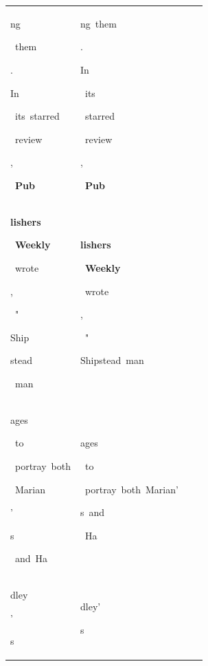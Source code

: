 \begin{table}[h]
\begin{tabular}{ l l l l }
 \colorbox{cm_31!40}{\strut ng}\colorbox{cm_29!40}{\strut \ them}\colorbox{cm_31!40}{\strut .}\colorbox{cm_29!40}{\strut }\colorbox{cm_31!40}{\strut }\colorbox{cm_25!40}{\strut In}\colorbox{cm_63!40}{\strut \ its\ starred}\colorbox{cm_32!40}{\strut \ review}\colorbox{cm_24!40}{\strut ,}\colorbox{cm_63!40}{\strut \ \textbf{Pub}} & \colorbox{cm_0!40}{\strut ng\ them}\colorbox{cm_12!40}{\strut .}\colorbox{cm_25!40}{\strut }\colorbox{cm_38!40}{\strut }\colorbox{cm_0!40}{\strut In}\colorbox{cm_12!40}{\strut \ its}\colorbox{cm_0!40}{\strut \ starred}\colorbox{cm_12!40}{\strut \ review}\colorbox{cm_25!40}{\strut ,}\colorbox{cm_12!40}{\strut \ \textbf{Pub}} &  &  \\ 
     \colorbox{cm_63!40}{\strut \textbf{lishers}}\colorbox{cm_32!40}{\strut \ \textbf{Weekly}}\colorbox{cm_63!40}{\strut \ wrote}\colorbox{cm_50!40}{\strut ,}\colorbox{cm_30!40}{\strut \ "}\colorbox{cm_54!40}{\strut Ship}\colorbox{cm_32!40}{\strut stead}\colorbox{cm_46!40}{\strut \ man} & \colorbox{cm_12!40}{\strut \textbf{lishers}}\colorbox{cm_25!40}{\strut \ \textbf{Weekly}}\colorbox{cm_38!40}{\strut \ wrote}\colorbox{cm_51!40}{\strut ,}\colorbox{cm_63!40}{\strut \ "}\colorbox{cm_0!40}{\strut Shipstead\ man} &  &  \\ 
 \colorbox{cm_46!40}{\strut ages}\colorbox{cm_33!40}{\strut \ to}\colorbox{cm_40!40}{\strut \ portray\ both}\colorbox{cm_0!40}{\strut \ Marian}\colorbox{cm_34!40}{\strut '}\colorbox{cm_31!40}{\strut s}\colorbox{cm_32!40}{\strut \ and\ Ha} & \colorbox{cm_0!40}{\strut ages}\colorbox{cm_12!40}{\strut \ to}\colorbox{cm_0!40}{\strut \ portray\ both\ Marian'}\colorbox{cm_12!40}{\strut s\ and}\colorbox{cm_0!40}{\strut \ Ha} &  &  \\ 
 \colorbox{cm_32!40}{\strut dley}\colorbox{cm_34!40}{\strut ’}\colorbox{cm_31!40}{\strut s} & \colorbox{cm_0!40}{\strut dley’}\colorbox{cm_12!40}{\strut s} &  &  \\ 
  \bottomrule 
  \end{tabular}
    \label{tab:data_wikisept21_greatcircle}
\end{table}